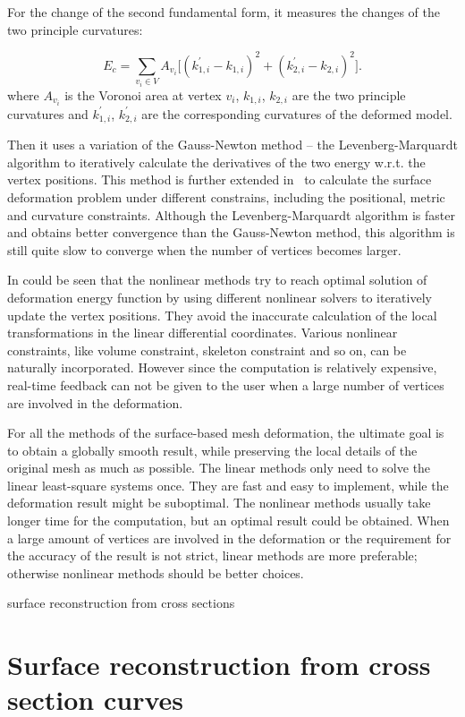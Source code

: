 For the change of the second fundamental form, it measures the changes of the two principle curvatures:

\begin{equation}
\label{eq:pcurvature}
E_c = \sum\limits_{v_i \in V}{A_{v_i} \Big[(k_{1,i}^\prime-k_{1,i})^2 + (k_{2,i}^\prime-k_{2,i})^2 \Big]}.
\end{equation}
where $A_{v_i}$ is the Voronoi area at vertex $v_i$, $k_{1,i}$, $k_{2,i}$ are the two principle curvatures and $k_{1,i}^\prime$, $k_{2,i}^\prime$ are the corresponding curvatures of the deformed model.

Then it uses a variation of the Gauss-Newton method -- the Levenberg-Marquardt algorithm to iteratively calculate the derivatives of the two energy w.r.t. the vertex positions. This method is further extended in~\cite{EP09} to calculate the surface deformation problem under different constrains, including the positional, metric and curvature constraints. Although the Levenberg-Marquardt algorithm is faster and obtains better convergence than the Gauss-Newton method, this algorithm is still quite slow to converge when the number of vertices becomes larger.

In could be seen that the nonlinear methods try to reach optimal solution of deformation energy function by using different nonlinear solvers to iteratively update the vertex positions. They avoid the inaccurate calculation of the local transformations in the linear differential coordinates. Various nonlinear constraints, like volume constraint, skeleton constraint and so on, can be naturally incorporated. However since the computation is relatively expensive, real-time feedback can not be given to the user when a large number of vertices are involved in the deformation.

For all the methods of the surface-based mesh deformation, the ultimate goal is to obtain a globally smooth result, while preserving the local details of the original mesh as much as possible. The linear methods only need to solve the linear least-square systems once. They are fast and easy to implement, while the deformation result might be suboptimal. The nonlinear methods usually take longer time for the computation, but an optimal result could be obtained. When a large amount of vertices are involved in the deformation or the requirement for the accuracy of the result is not strict, linear methods are more preferable; otherwise nonlinear methods should be better choices. 


surface reconstruction from cross sections

\section{Surface reconstruction from cross section curves}\label{ch2:sec:surfreconst}

